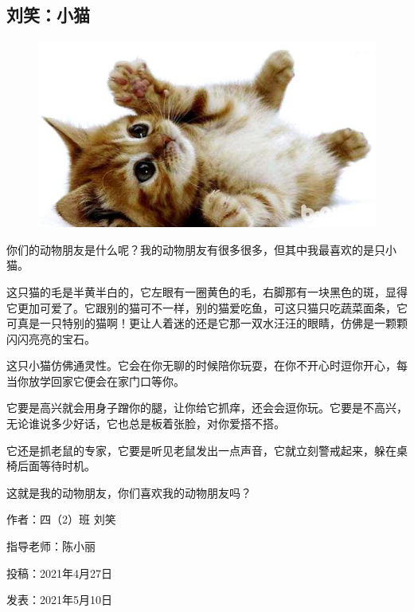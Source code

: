 \vspace{10pt}

{\centering\subsection*{刘笑：小猫}}


\renewcommand{\leftmark}{刘笑：小猫}

\begin{figure}[htbp]

\centering

\includegraphics[width = .5\textwidth]{./ch/28.jpg}

\end{figure}




你们的动物朋友是什么呢？我的动物朋友有很多很多，但其中我最喜欢的是只小猫。



这只猫的毛是半黄半白的，它左眼有一圈黄色的毛，右脚那有一块黑色的斑，显得它更加可爱了。它跟别的猫可不一样，别的猫爱吃鱼，可这只猫只吃蔬菜面条，它可真是一只特别的猫啊！更让人着迷的还是它那一双水汪汪的眼睛，仿佛是一颗颗闪闪亮亮的宝石。



这只小猫仿佛通灵性。它会在你无聊的时候陪你玩耍，在你不开心时逗你开心，每当你放学回家它便会在家门口等你。



它要是高兴就会用身子蹭你的腿，让你给它抓痒，还会会逗你玩。它要是不高兴，无论谁说多少好话，它也总是板着张脸，对你爱搭不搭。



它还是抓老鼠的专家，它要是听见老鼠发出一点声音，它就立刻警戒起来，躲在桌椅后面等待时机。



这就是我的动物朋友，你们喜欢我的动物朋友吗？





\vspace{10pt}



作者：四（2）班 刘笑



指导老师：陈小丽



投稿：2021年4月27日



发表：2021年5月10日








                



\vspace{10pt}

\hline



